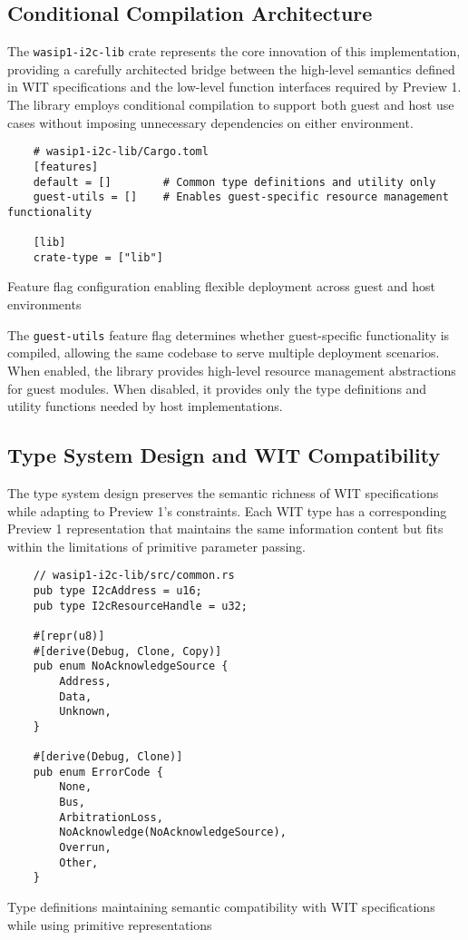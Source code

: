\subsection{Conditional Compilation Architecture}

The \texttt{wasip1-i2c-lib} crate represents the core innovation of this implementation, providing a carefully architected bridge between the high-level semantics defined in WIT specifications and the low-level function interfaces required by Preview 1. The library employs conditional compilation to support both guest and host use cases without imposing unnecessary dependencies on either environment.

\begin{listing}[H]
    \begin{verbatim}
    # wasip1-i2c-lib/Cargo.toml
    [features]
    default = []        # Common type definitions and utility only
    guest-utils = []    # Enables guest-specific resource management functionality
    
    [lib]
    crate-type = ["lib"]
    \end{verbatim}
    \caption{Feature flag configuration enabling flexible deployment across guest and host environments}
    \label{lst:conditional-compilation}
\end{listing}

The \texttt{guest-utils} feature flag determines whether guest-specific functionality is compiled, allowing the same codebase to serve multiple deployment scenarios. When enabled, the library provides high-level resource management abstractions for guest modules. When disabled, it provides only the type definitions and utility functions needed by host implementations.

\subsection{Type System Design and WIT Compatibility}

The type system design preserves the semantic richness of WIT specifications while adapting to Preview 1's constraints. Each WIT type has a corresponding Preview 1 representation that maintains the same information content but fits within the limitations of primitive parameter passing.

\begin{listing}[H]
    \begin{verbatim}
    // wasip1-i2c-lib/src/common.rs
    pub type I2cAddress = u16;
    pub type I2cResourceHandle = u32;
    
    #[repr(u8)]
    #[derive(Debug, Clone, Copy)]
    pub enum NoAcknowledgeSource {
        Address,
        Data,
        Unknown,
    }
    
    #[derive(Debug, Clone)]
    pub enum ErrorCode {
        None,
        Bus,
        ArbitrationLoss,
        NoAcknowledge(NoAcknowledgeSource),
        Overrun,
        Other,
    }
    \end{verbatim}
    \caption{Type definitions maintaining semantic compatibility with WIT specifications while using primitive representations}
    \label{lst:type-definitions}
\end{listing}

